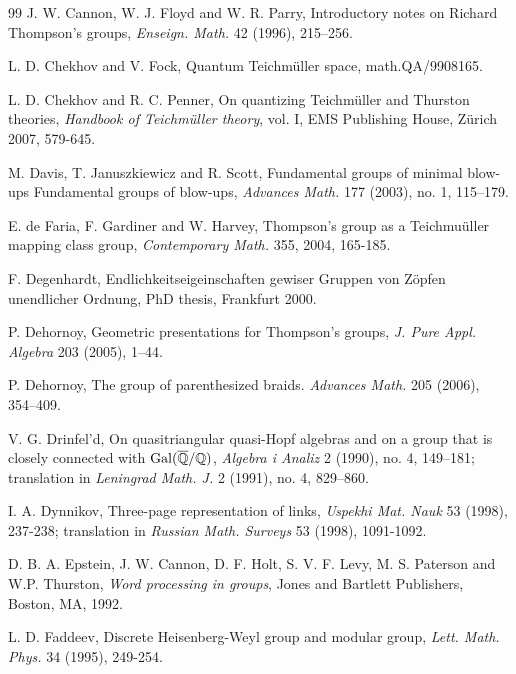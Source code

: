 \documentclass[twoside]{irmaems}
\theoremstyle{plain}
\theoremstyle{definition}
\theoremstyle{remark}
\newcommand{\Q}{{\mathbb{Q}}}
\begin{document}
\begin{small}
\begin{thebibliography}{99}
J. W. Cannon, W. J. Floyd and W. R. Parry,      
{Introductory notes on Richard Thompson's groups},      
{\em Enseign. Math.} 42 (1996), 215--256.    



L. D. Chekhov and V. Fock, { Quantum Teichm\"uller space}, 
math.QA/9908165. 

L. D. Chekhov and R. C. Penner, { On quantizing Teichm\"uller and Thurston theories}, {\em Handbook of Teichm\"uller theory}, vol. I, EMS Publishing House, Z\"urich 
2007, 579-645.  


M. Davis, T. Januszkiewicz and R. Scott, { Fundamental groups of minimal
blow-ups Fundamental groups of blow-ups},   {\em Advances Math. } 177  (2003),  no. 1, 115--179. 


E. de Faria, F. Gardiner and W. Harvey, {Thompson's group as a Teichmu\"uller mapping class group}, {\em Contemporary Math.} 355, 2004, 165-185. 


F. Degenhardt, {Endlichkeitseigeinschaften gewiser Gruppen 
von Z\"opfen unendlicher Ordnung}, PhD thesis, Frankfurt 2000. 
      

 

P. Dehornoy, {Geometric presentations for Thompson's groups,}  
{\em J. Pure Appl. Algebra}  203  (2005),   1--44.

P. Dehornoy, { The group of parenthesized braids}.  {\em 
Advances Math.}  205  (2006),   354--409.  


 

         
  V. G. Drinfel'd,          
{ On quasitriangular quasi-Hopf algebras and on a group that is        
  closely connected with ${\rm Gal}(\overline{\Q}/\Q)$},         
{\em Algebra i Analiz} 2 (1990), no. 4, 149--181; translation in         
{\em Leningrad Math. J.} 2 (1991), no. 4, 829--860.  

I. A. Dynnikov,
{Three-page representation of links}, 
{\em Uspekhi Mat. Nauk} 53 (1998), 237-238; 
translation in {\em Russian Math. Surveys} 53 (1998),  1091-1092.    

D. B. A. Epstein, J. W. Cannon, D. F. Holt, S. V. F. Levy, M. S. Paterson
and  W.P. Thurston, {\em Word processing in groups}, {
Jones and Bartlett Publishers}, Boston, MA, 1992.  
 



L. D. Faddeev, { Discrete Heisenberg-Weyl group and modular group}, 
{\em Lett. Math. Phys.} 34 (1995), 249-254. 
      



\end{thebibliography}
\end{small}
\end{document}
